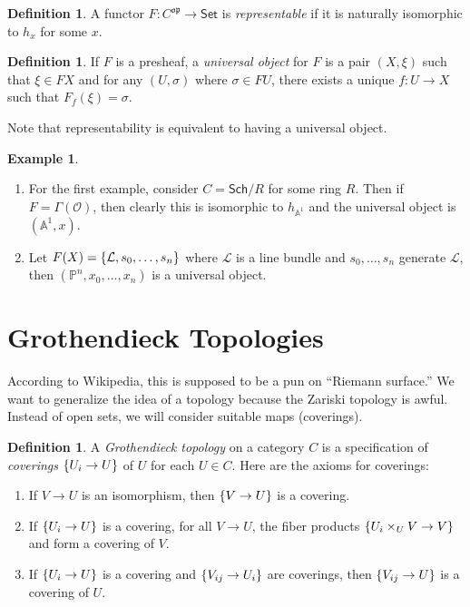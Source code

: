 \documentclass[leqno, openany]{memoir}
\theoremstyle{definition}
\newtheorem{defn}[thm]{Definition}
\newtheorem{exm}[thm]{Example}
\theoremstyle{remark}
\theoremstyle{plain}
\theoremstyle{definition}
\theoremstyle{remark}
\newcommand{\A}{\mathbb{A}}
\renewcommand{\P}{\mathbb{P}}
\newcommand{\mc}[1]{\mathcal{#1}}
\newcommand{\mf}[1]{\mathfrak{#1}}
\newcommand{\ms}[1]{\mathsf{#1}}
\begin{document}
\begin{defn}
    A functor $F \colon C^{\mf{op}} \to \ms{Set}$ is \textit{representable} if it is naturally isomorphic to $h_x$ for some $x$. 
\end{defn}

\begin{defn}
    If $F$ is a presheaf, a \textit{universal object} for $F$ is a pair $(X, \xi)$ such that $\xi \in FX$ and for any $(U, \sigma)$ where $\sigma \in FU$, there exists a unique $f \colon U \to X$ such that $F_f(\xi) = \sigma$.
\end{defn}

Note that representability is equivalent to having a universal object.

\begin{exm}
    \begin{enumerate}
        \item For the first example, consider $C = \ms{Sch}/R$ for some ring $R$. Then if $F = \Gamma(\mc{O})$, then clearly this is isomorphic to $h_{\A^1}$ and the universal object is $(\A^1, x)$.
        \item Let $F(X) = \qty{\mc{L}, s_0, \ldots, s_n}$ where $\mc{L}$ is a line bundle and $s_0, \ldots, s_n$ generate $\mc{L}$, then $(\P^n, x_0, \ldots, x_n)$ is a universal object.
    \end{enumerate}
\end{exm}

\section{Grothendieck Topologies}%
\label{sec:grothendieck_topologies}

According to Wikipedia, this is supposed to be a pun on ``Riemann surface.'' We want to generalize the idea of a topology because the Zariski topology is awful. Instead of open sets, we will consider suitable maps (coverings).

\begin{defn}
    A \textit{Grothendieck topology} on a category $C$ is a specification of \textit{coverings} $\qty{U_i \to U}$ of $U$ for each $U \in C$. Here are the axioms for coverings:
    \begin{enumerate}
        \item If $V \to U$ is an isomorphism, then $\qty{V \to U}$ is a covering.
        \item If $\qty{U_i \to U}$ is a covering, for all $V \to U$, the fiber products $\qty{ U_i \times_U V \to V }$ and form a covering of $V$.
        \item If $\qty{U_i \to U}$ is a covering and $\qty{V_{ij} \to U_i}$ are coverings, then $\qty{V_{ij} \to U}$ is a covering of $U$.
    \end{enumerate}
\end{defn}
\end{document}
